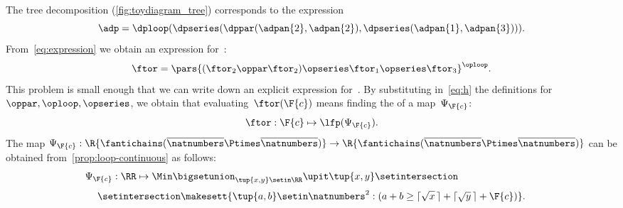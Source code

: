 \begin{marginfigure}
    \caption{}
    \label{fig:toydiagram_tree}
\end{marginfigure}

The tree decomposition (\cref{fig:toydiagram_tree}) corresponds to the expression
%
\begin{equation}
    \adp=\dploop(\dpseries(\dppar(\adpan{2},\adpan{2}),\dpseries(\adpan{1},\adpan{3}))).
    \label{eq:expression}
\end{equation}
%
From~\cref{eq:expression} we obtain an expression for~\ftor:
%
\begin{equation}
    \ftor=\pars{(\ftor_{2}\oppar\ftor_{2})\opseries\ftor_{1}\opseries\ftor_{3}}^{\oploop}.
    \label{eq:h}
\end{equation}
%
This problem is small enough that we can write down an explicit expression for~\ftor.
By substituting in~\cref{eq:h} the definitions for $\oppar, \oploop, \opseries$, we obtain that evaluating~$\ftor(\F{c})$ means finding the  of a map~$\Psi_{\F{c}}$:
%
\begin{equation}
    \ftor:\F{c}\mapsto\lfp(\Psi_{\F{c}}).
\end{equation}
%
The map $\Psi_{\F{c}}:\R{\fantichains(\overline{\natnumbers}\Ptimes\overline{\natnumbers})}\rightarrow\R{\fantichains(\overline{\natnumbers}\Ptimes\overline{\natnumbers})}$ can be obtained from~\cref{prop:loop-continuous} as follows:
%
\begin{equation}
    \Psi_{\F{c}}:\RR\mapsto\Min\bigsetunion_{\tup{x,y} \setin\RR}\upit\tup{x,y} \setintersection\qquad\qquad\qquad\qquad
\end{equation}
%
\begin{equation}
    \setintersection \makesett{
        \tup{a,b} \setin\natnumbers^{2}:
        (
        a+b\geq\lceil\sqrt{x}\,\rceil+\lceil\sqrt{y}\,\rceil+\F{c}
        )
    }.
\end{equation}
%

